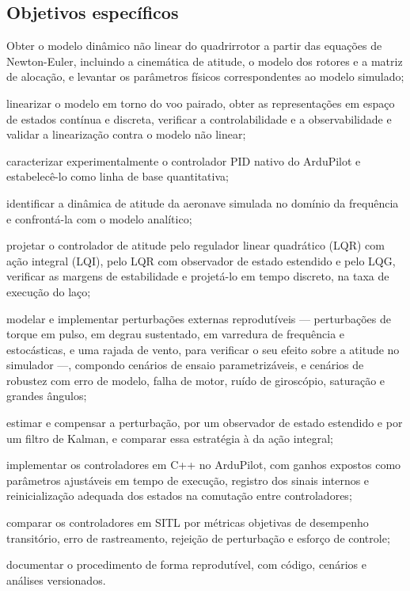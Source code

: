 \subsection{Objetivos específicos}

\begin{alineas}
    \item Obter o modelo dinâmico não linear do quadrirrotor a partir das
          equações de Newton-Euler, incluindo a cinemática de atitude, o modelo
          dos rotores e a matriz de alocação, e levantar os parâmetros físicos
          correspondentes ao modelo simulado;
    \item linearizar o modelo em torno do voo pairado, obter as
          representações em espaço de estados contínua e discreta, verificar a
          controlabilidade e a observabilidade e validar a linearização contra
          o modelo não linear;
    \item caracterizar experimentalmente o controlador PID nativo do
          ArduPilot e estabelecê-lo como linha de base quantitativa;
    \item identificar a dinâmica de atitude da aeronave simulada no domínio da
          frequência e confrontá-la com o modelo analítico;
    \item projetar o controlador de atitude pelo regulador linear quadrático
          (LQR) com ação integral (LQI), pelo LQR com observador de estado
          estendido e pelo LQG, verificar as margens de estabilidade e
          projetá-lo em tempo discreto, na taxa de execução do laço;
    \item modelar e implementar perturbações externas reprodutíveis ---
          perturbações de torque em pulso, em degrau sustentado, em varredura
          de frequência e estocásticas, e uma rajada de vento, para verificar
          o seu efeito sobre a atitude no simulador ---, compondo cenários de
          ensaio parametrizáveis, e cenários de robustez com erro de modelo,
          falha de motor, ruído de giroscópio, saturação e grandes ângulos;
    \item estimar e compensar a perturbação, por um observador de estado
          estendido e por um filtro de Kalman, e comparar essa estratégia à
          da ação integral;
    \item implementar os controladores em C++ no ArduPilot, com ganhos expostos
          como parâmetros ajustáveis em tempo de execução, registro dos sinais
          internos e reinicialização adequada dos estados na comutação entre
          controladores;
    \item comparar os controladores em SITL por métricas objetivas de
          desempenho transitório, erro de rastreamento, rejeição de
          perturbação e esforço de controle;
    \item documentar o procedimento de forma reprodutível, com código, cenários
          e análises versionados.
\end{alineas}

